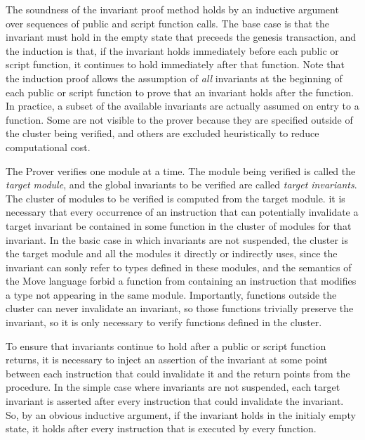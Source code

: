 The soundness of the invariant proof method holds by an inductive
argument over sequences of public and script function calls.  The base
case is that the invariant must hold in the empty state that preceeds
the genesis transaction, and the induction is that, if the invariant
holds immediately before each public or script function, it continues
to hold immediately after that function.  Note that the induction
proof allows the assumption of \textit{all} invariants at the
beginning of each public or script function to prove that an invariant
holds after the function.  In practice, a subset of the available
invariants are actually assumed on entry to a function. Some are not
visible to the prover because they are specified outside of the
cluster being verified, and others are excluded heuristically to
reduce computational cost.


The Prover verifies one module at a time.  The module being verified
is called the \textit{target module}, and the global invariants to be
verified are called \textit{target invariants}. The cluster of modules
to be verified is computed from the target module.  it is necessary
that every occurrence of an instruction that can potentially
invalidate a target invariant be contained in some function in the
cluster of modules for that invariant.  In the basic case in which
invariants are not suspended, the cluster is the target module and all
the modules it directly or indirectly uses, since the invariant can
sonly refer to types defined in these modules, and the semantics of the
Move language forbid a function from containing an instruction that
modifies a type not appearing in the same module. Importantly,
functions outside the cluster can never invalidate an invariant, so
those functions trivially preserve the invariant, so it is only
necessary to verify functions defined in the cluster.

To ensure that invariants continue to hold after a public or script
function returns, it is necessary to inject an assertion of the invariant at some
point between each instruction that could invalidate it and the return
points from the procedure.  In the simple case where invariants are
not suspended, each target invariant is asserted after
every instruction that could invalidate the invariant. So, by an
obvious inductive argument, if the invariant holds in the initialy
empty state, it holds after every instruction that is executed by
every function.

